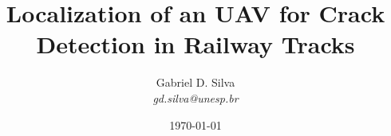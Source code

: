 \documentclass[aspectratio=169, 14pt]{beamer}
\title{Localization of an UAV for Crack Detection in Railway Tracks}
\author[Gabriel D. Silva]{Gabriel D. Silva \\ {\itshape\footnotesize gd.silva@unesp.br}}
\institute[FEIS/UNESP]{\includegraphics[scale=0.6]               
{figures/logos/feisunesp-centered-black.pdf}}
\date{\today}
\begin{document}
\begin{frame}                                                       
	\titlepage                                                      
\end{frame}                                                         
\begin{frame}                                                       
	\tableofcontents                                                
\end{frame}                                                         






\end{document}
